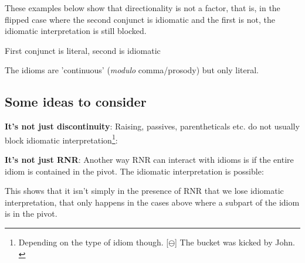 \documentclass[paper=letter, fontsize=12pt]{scrartcl} %
\numberwithin{equation}{section} %
\numberwithin{figure}{section} %
\numberwithin{table}{section} %
\begin{document}
These examples below show that directionality is not a factor, that is, in the flipped case where the second conjunct is idiomatic and the first is not, the idiomatic interpretation is still blocked.

\begin{exe}
\ex First conjunct is literal, second is idiomatic
\begin{xlista} 
		\label{cut-cheese}
\end{xlista}
\end{exe}
 
The idioms are 'continuous' (\textit{modulo} comma/prosody) but only literal.

\newpage

\subsection{Some ideas to consider}

\textbf{It's not just discontinuity}: Raising, passives, parentheticals etc. do not usually block idiomatic interpretation\footnote{Depending on the type of idiom though. [$\ominus$] The bucket was kicked by John. \citep{Machonis:1985}}: 

\begin{exe}
\label{cat-long}
\end{exe}




\textbf{It's not just RNR}: Another way RNR can interact with idioms is if the entire idiom is contained in the pivot. The idiomatic interpretation is possible:


\begin{exe}
	\end{exe}

This shows that it isn't simply in the presence of RNR that we lose idiomatic interpretation, that only happens in the cases above where a subpart of the idiom is in the pivot.
\end{document}
